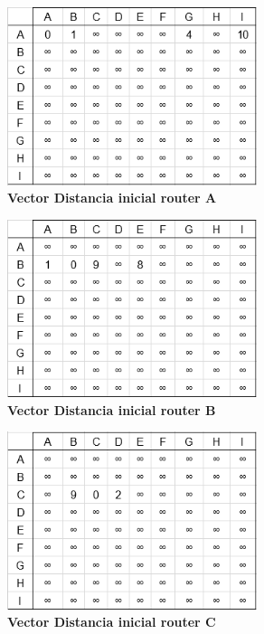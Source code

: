 \documentclass[12pt]{article}
\begin{document}
\begin{figure}[H] 
\centering 
\includegraphics[width=0.65\textwidth]{imagenes/2inicialA.png} \caption{\small \textbf{Vector Distancia inicial router A}}
\label{fig:diagrama_8} 
\end{figure}

\begin{figure}[H] 
\centering 
\includegraphics[width=0.65\textwidth]{imagenes/2inicialB.png} \caption{\small \textbf{Vector Distancia inicial router B}}
\label{fig:diagrama_9} 
\end{figure}

\begin{figure}[H] 
\centering 
\includegraphics[width=0.65\textwidth]{imagenes/2inicialC.png} \caption{\small \textbf{Vector Distancia inicial router C}}
\label{fig:diagrama_10} 
\end{figure}
\end{document}

